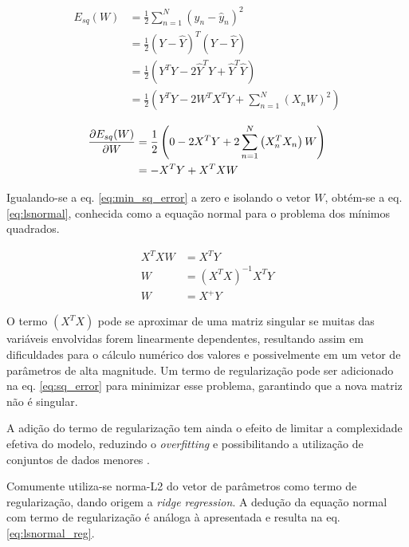 \begin{equation}
\begin{split}
      E_{sq}(W) {}&= \frac{1}{2} \sum_{n = 1}^{N}\left(y_n-\hat{y}_n\right)^2 \\
      &= \frac{1}{2} (Y-\hat{Y})^T(Y-\hat{Y})\\
      &= \frac{1}{2} \left( Y^TY - 2 \hat{Y}^TY + \hat{Y}^T\hat{Y} \right)\\
      &= \frac{1}{2} \left( Y^TY - 2 W^TX^TY + \sum_{n = 1}^{N}\left(X_nW \right)^2 \right)
    \label{eq:sq_error}  
\end{split}
\end{equation}

\begin{equation}\begin{split}
    \pdv{E_{sq}(W)}{W} &= \frac{1}{2} \left( 0 - 2 X^TY + 2\sum_{n = 1}^{N}\left(X_n^TX_n \right)W  \right) \\
    &= - X^TY + X^TX W
    \label{eq:min_sq_error}
\end{split}\end{equation}

Igualando-se a eq. \ref{eq:min_sq_error} a zero e isolando o vetor $W$, obtém-se a eq. \ref{eq:lsnormal}, conhecida como a equação normal para o problema dos mínimos quadrados.

\begin{equation}\begin{split}
    X^TX W &= X^TY \\
    W &= (X^TX)^{-1}X^TY \\
    W &=X^+ Y
    \label{eq:lsnormal}
\end{split}\end{equation}

O termo $(X^TX)$ pode se aproximar de uma matriz singular se muitas das variáveis envolvidas forem linearmente dependentes, resultando assim em dificuldades para o cálculo numérico dos valores e possivelmente em um vetor de parâmetros de alta magnitude. Um termo de regularização pode ser adicionado na eq. \ref{eq:sq_error} 
para minimizar esse problema, garantindo que a nova matriz não é singular.

A adição do termo de regularização tem ainda o efeito de limitar a complexidade efetiva do modelo, reduzindo o \textit{overfitting} e possibilitando a utilização de conjuntos de dados menores \cite{bishop_2006}.

Comumente utiliza-se norma-L2 do vetor de parâmetros como termo de regularização, dando origem a \textit{ridge regression}. A dedução da equação normal com termo de regularização é análoga à apresentada e resulta na eq. \ref{eq:lsnormal_reg}.

